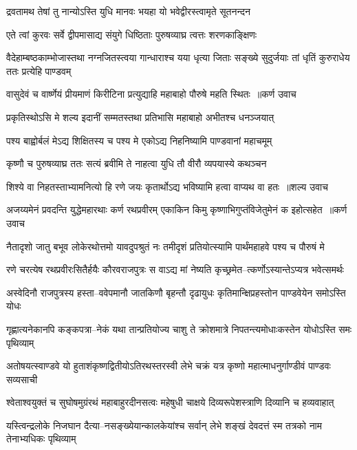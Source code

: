 \twolineshloka
{द्रवतामथ तेषां तु नान्योऽस्ति युधि मानवः}
{भयहा यो भवेद्वीरस्त्वामृते सूतनन्दन}


\twolineshloka
{एते त्वां कुरवः सर्वे द्वीपमासाद्य संयुगे}
{धिष्ठिताः पुरुषव्याघ्र त्वत्तः शरणकाङ्क्षिणः}


\threelineshloka
{वैदेहाम्बष्ठकाम्भोजास्तथा नग्नजितस्त्वया}
{गान्धाराश्च यया धृत्या जिताः सङ्ख्ये सुदुर्जयाः}
{तां धृतिं कुरुराधेय ततः प्रत्येहि पाण्डवम्}


\threelineshloka
{वासुदेवं च वार्ष्णेयं प्रीयमाणं किरीटिना}
{प्रत्युद्याहि महाबाहो पौरुषे महति स्थितः ॥कर्ण उवाच}
{}


\twolineshloka
{प्रकृतिस्थोऽसि मे शल्य इदानीं सम्मतस्तथा}
{प्रतिभासि महाबाहो अभीतश्च धनञ्जयात्}


\twolineshloka
{पश्य बाह्वोर्बलं मेऽद्य शिक्षितस्य च पश्य मे}
{एकोऽद्य निहनिष्यामि पाण्डवानां महाचमूम्}


\twolineshloka
{कृष्णौ च पुरुषव्याघ्र ततः सत्यं ब्रवीमि ते}
{नाहत्वा युधि तौ वीरौ व्यपयास्ये कथञ्चन}


\threelineshloka
{शिश्ये वा निहतस्ताभ्यामनित्यो हि रणे जयः}
{कृतार्थोऽद्य भविष्यामि हत्वा वाप्यथ वा हतः ॥शल्य उवाच}
{}


\threelineshloka
{अजय्यमेनं प्रवदन्ति युद्धेमहारथाः कर्ण रथप्रवीरम्}
{एकाकिन किमु कृष्णाभिगुप्तंविजेतुमेनं क इहोत्सहेत ॥कर्ण उवाच}
{}


\twolineshloka
{नैतादृशो जातु बभूव लोकेरथोत्तमो यावदुपश्रुतं नः}
{तमीदृशं प्रतियोत्स्यामि पार्थंमहाहवे पश्य च पौरुषं मे}


\twolineshloka
{रणे चरत्येष रथप्रवीरःसितैर्हयैः कौरवराजपुत्रः}
{स वाऽद्य मां नेष्यति कृच्छ्रमेत--त्कर्णोऽस्यान्तेऽप्यत्र भवेत्समर्थः}


\twolineshloka
{अस्वेदिनौ राजपुत्रस्य हस्ता--ववेपमानौ जातकिणौ बृहन्तौ}
{दृढायुधः कृतिमान्क्षिप्रहस्तोन पाण्डवेयेन समोऽस्ति योधः}


\twolineshloka
{गृह्णात्यनेकानपि कङ्कपत्रा--नेकं यथा तान्प्रतियोज्य चाशु}
{ते क्रोशमात्रे निपतन्त्यमोधाःकस्तेन योधोऽस्ति समः पृथिव्याम्}


\twolineshloka
{अतोषयत्स्वाण्डवे यो हुताशंकृष्णद्वितीयोऽतिरथस्तरस्वी}
{लेभे चक्रं यत्र कृष्णो महात्माधनुर्गाण्डीवं पाण्डवः सव्यसाची}


\twolineshloka
{श्वेताश्वयुक्तं च सुघोषमुग्रंरथं महाबाहुरदीनसत्वः}
{महेषुधी चाक्षये दिव्यरूपेशस्त्राणि दिव्यानि च हव्यवाहात्}


\twolineshloka
{यस्त्विन्द्रलोके निजघान दैत्या--नसङ्ख्येयान्कालकेयांश्च सर्वान्}
{लेभे शङ्खं देवदत्तं स्म तत्रको नाम तेनाभ्यधिकः पृथिव्याम्}



